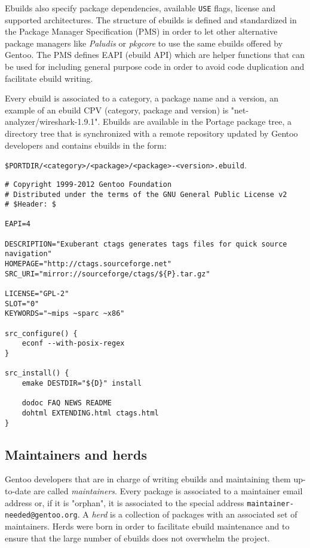 Ebuilds also specify package dependencies, available \texttt{USE} flags, license and supported architectures.
The structure of ebuilds is defined and standardized in the Package Manager Specification (PMS) \cite{gentoo_pms} in order to let other alternative package managers like \emph{Paludis} or \emph{pkgcore} to use the same ebuilds offered by Gentoo. The PMS defines EAPI (ebuild API) which are helper functions that can be used for including general purpose code in order to avoid code duplication and facilitate ebuild writing.

Every ebuild is associated to a category, a package name and a version, an example of an ebuild CPV (category, package and version) is "net-analyzer/wireshark-1.9.1".
Ebuilds are available in the Portage package tree, a directory tree that is synchronized with a remote repository updated by Gentoo developers and contains ebuilds in the form:

\texttt{\$PORTDIR/<category>/<package>/<package>-<version>.ebuild}.


\vspace{0.5cm}
\lstset{language=bash, caption=Simplified ebuild for "Exuberant ctags", label=Example of an ebuild, numbers=left, stepnumber=2, frame=single, breaklines=true}
\begin{lstlisting}
# Copyright 1999-2012 Gentoo Foundation
# Distributed under the terms of the GNU General Public License v2
# $Header: $

EAPI=4

DESCRIPTION="Exuberant ctags generates tags files for quick source navigation"
HOMEPAGE="http://ctags.sourceforge.net"
SRC_URI="mirror://sourceforge/ctags/${P}.tar.gz"

LICENSE="GPL-2"
SLOT="0"
KEYWORDS="~mips ~sparc ~x86"

src_configure() {
    econf --with-posix-regex
}

src_install() {
    emake DESTDIR="${D}" install

    dodoc FAQ NEWS README
    dohtml EXTENDING.html ctags.html
}
\end{lstlisting}
\vspace{0.5cm}


\subsection{Maintainers and herds}
Gentoo developers that are in charge of writing ebuilds and maintaining them up-to-date are called \emph{maintainers}. Every package is associated to a maintainer email address or, if it is "orphan", it is associated to the special address \texttt{maintainer-needed@gentoo.org}.
A \emph{herd} is a collection of packages with an associated set of maintainers. Herds were born in order to facilitate ebuild maintenance and to ensure that the large number of ebuilds does not overwhelm the project.



